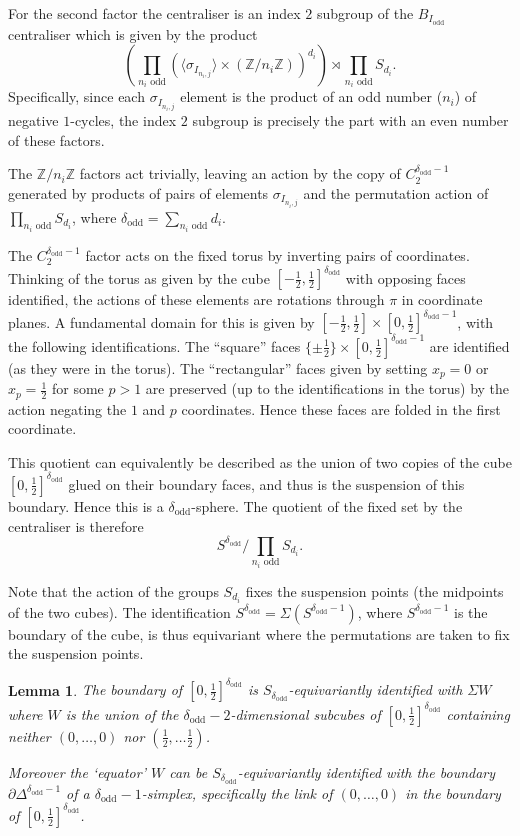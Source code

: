 \documentclass[11pt,a4paper]{article}
\newtheorem{lemma}[theorem]{Lemma}
\def\Z{\mathbb{Z}}
\def\odd{\mathrm{odd}}
\begin{document}
For the second factor the centraliser is an index $2$ subgroup of the $B_{I_{\odd}}$ centraliser which is given by the product
\[
\left(\prod_{n_i\text{ odd}}(\langle \sigma_{I_{n_i,j}}\rangle \times (\Z/n_i\Z))^{d_i}\right)\rtimes\prod_{n_i\text{ odd}} S_{d_i}.
\]
Specifically, since each $\sigma_{I_{n_i,j}}$ element is the product of an odd number ($n_i$) of negative $1$-cycles, the index $2$ subgroup is precisely the part with an even number of these  factors.

The $\Z/n_i\Z$ factors act trivially, leaving an action by the copy of $C_2^{{\delta_\odd}-1}$ generated by products of pairs of elements $\sigma_{I_{n_i,j}}$ and the permutation action of $\prod\limits_{n_i\text{ odd}} S_{d_i}$, where ${\delta_\odd}=\sum\limits_{n_i \text{ odd}} d_i$.

The $C_2^{{\delta_\odd}-1}$ factor acts on the fixed torus by inverting pairs of coordinates.  Thinking of the torus as given by the cube $[-\frac 12,\frac 12]^{\delta_\odd}$ with opposing faces identified, the actions of these elements are rotations through $\pi$ in coordinate planes.  A fundamental domain for this is given by $[-\frac 12,\frac 12] \times [0,\frac 12]^{{\delta_\odd}-1}$, with the following identifications.  The ``square'' faces $\{\pm \frac 12\}\times [0,\frac 12]^{{\delta_\odd}-1}$ are identified (as they were in the torus).  The ``rectangular'' faces given by setting $x_p=0$ or $x_p=\frac 12$ for some $p>1$ are preserved (up to the identifications in the torus) by the action negating the $1$ and $p$ coordinates.  Hence these faces are folded in the first coordinate.

This quotient can equivalently be described as the union of two copies of the cube $[0,\frac 12]^{{\delta_\odd}}$ glued on their boundary faces, and thus is the suspension of this boundary.  Hence this is a ${\delta_\odd}$-sphere.  The quotient of the fixed set by the centraliser is therefore
\[
S^{\delta_\odd}/\prod_{n_i \text{ odd}} S_{d_i}.
\]


Note that the action of the groups $S_{d_i}$  fixes the suspension points (the midpoints of the two cubes).  The identification $S^{\delta_\odd}=\Sigma(S^{{\delta_\odd}-1})$, where $S^{{\delta_\odd}-1}$ is the boundary of the cube, is thus equivariant where the permutations are taken to fix the suspension points.

\begin{lemma}\label{equator lemma}
    The boundary of $[0,\frac12]^{\delta_\odd}$ is $S_{\delta_\odd}$-equivariantly identified with $\Sigma W$ where $W$ is the union of the 
    ${\delta_\odd}-2$-dimensional subcubes of $[0,\frac12]^{\delta_\odd}$ containing neither $(0,\dots,0)$ nor $(\frac  12,\dots\frac 12)$.

    Moreover the `equator' $W$ can be $S_{\delta_\odd}$-equivariantly identified with the boundary $\partial\Delta^{{\delta_\odd}-1}$ of a ${\delta_\odd}-1$-simplex, specifically the link of $(0,\dots,0)$ in the boundary of $[0,\frac12]^{\delta_\odd}$.
\end{lemma}
\end{document}
